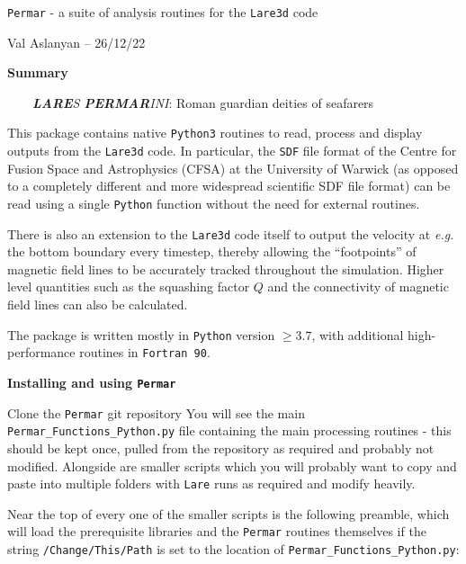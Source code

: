 \documentclass[12pt,twoside]{article}
\begin{document}
\begin{center}
{\LARGE \texttt{Permar} - a suite of analysis routines for the \texttt{Lare3d} code}

Val Aslanyan -- 26/12/22
\end{center}

{\large \textbf{Summary}}

\vspace{1mm}

$\quad\quad$\textit{\textbf{LARE}S \textbf{PERMAR}INI}: Roman guardian deities of seafarers

\vspace{1mm}

This package contains native \texttt{Python3} routines to read, process and display outputs from the \texttt{Lare3d} code. In particular, the \texttt{SDF} file format of the Centre for Fusion Space and Astrophysics (CFSA) at the University of Warwick (as opposed to a completely different and more widespread scientific SDF file format) can be read using a single \texttt{Python} function without the need for external routines.

There is also an extension to the \texttt{Lare3d} code itself to output the velocity at \textit{e.g.} the bottom boundary every timestep, thereby allowing the ``footpoints'' of magnetic field lines to be accurately tracked throughout the simulation. Higher level quantities such as the squashing factor $Q$ and the connectivity of magnetic field lines can also be calculated.

The package is written mostly in \texttt{Python} version $\geq 3.7$, with additional high-performance routines in \texttt{Fortran 90}.


\vspace{4mm}
{\large \textbf{Installing and using \texttt{Permar}}}

Clone the \texttt{Permar} git repository
You will see the main \texttt{Permar\_Functions\_Python.py} file containing the main processing routines - this should be kept once, pulled from the repository as required and probably not modified. Alongside are smaller scripts which you will probably want to copy and paste into multiple folders with \texttt{Lare} runs as required and modify heavily.

\vspace{2mm}

Near the top of every one of the smaller scripts is the following preamble, which will load the prerequisite libraries and the \texttt{Permar} routines themselves if the string \texttt{\textquotesingle /Change/This/Path\textquotesingle} is set to the location of \texttt{Permar\_Functions\_Python.py}:
\end{document}
